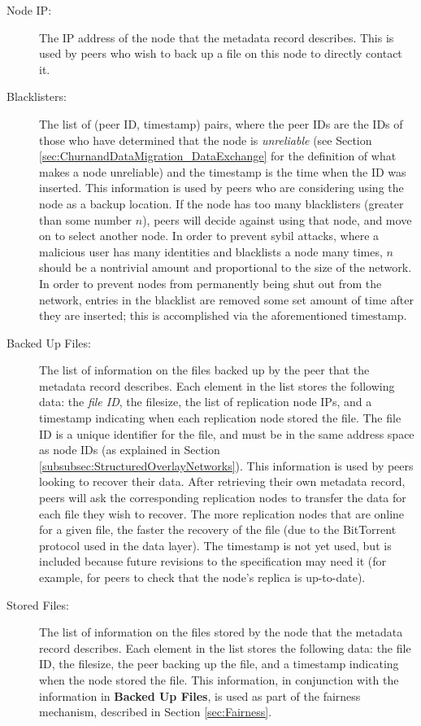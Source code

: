 \documentclass[12pt]{report}
\begin{document}
\begin{description}
  \item[Node IP:] The IP address of the node that the metadata record describes. This is used by peers who wish to back up a file on this node to directly contact it.
  \item[Blacklisters:] The list of (peer ID, timestamp) pairs, where the peer IDs are the IDs of those who have determined that the node is \textit{unreliable} (see Section \ref{sec:ChurnandDataMigration_DataExchange} for the definition of what makes a node unreliable) and the timestamp is the time when the ID was inserted. This information is used by peers who are considering using the node as a backup location. If the node has too many blacklisters (greater than some number $n$), peers will decide against using that node, and move on to select another node. In order to prevent sybil attacks, where a malicious user has many identities and blacklists a node many times, $n$ should be a nontrivial amount and proportional to the size of the network. In order to prevent nodes from permanently being shut out from the network, entries in the blacklist are removed some set amount of time after they are inserted; this is accomplished via the aforementioned timestamp.
  \item[Backed Up Files:] The list of information on the files backed up by the peer that the metadata record describes. Each element in the list stores the following data: the \textit{file ID}, the filesize, the list of replication node IPs, and a timestamp indicating when each replication node stored the file. The file ID is a unique identifier for the file, and must be in the same address space as node IDs (as explained in Section \ref{subsubsec:StructuredOverlayNetworks}). This information is used by peers looking to recover their data. After retrieving their own metadata record, peers will ask the corresponding replication nodes to transfer the data for each file they wish to recover. The more replication nodes that are online for a given file, the faster the recovery of the file (due to the BitTorrent protocol used in the data layer). The timestamp is not yet used, but is included because future revisions to the specification may need it (for example, for peers to check that the node's replica is up-to-date).
  \item[Stored Files:] The list of information on the files stored by the node that the metadata record describes. Each element in the list stores the following data: the file ID, the filesize, the peer backing up the file, and a timestamp indicating when the node stored the file. This information, in conjunction with the information in \textbf{Backed Up Files}, is used as part of the fairness mechanism, described in Section \ref{sec:Fairness}.
\end{description}
\end{document}
